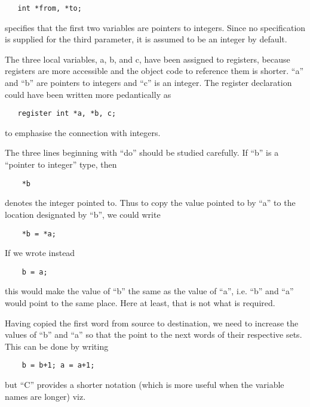 \begin{verbatim}
   int *from, *to;
\end{verbatim}

\noindent specifies that the first two variables
are pointers to integers. Since no
specification is supplied for the third
parameter, it is assumed to be an
integer by default.

The three local variables, a, b, and c,
have been assigned to registers,
because registers are more accessible
and the object code to reference them
is shorter. ``a'' and ``b'' are pointers to
integers and ``c'' is an integer. The
register declaration could have been
written more pedantically as

\begin{verbatim}
   register int *a, *b, c;
\end{verbatim}

\noindent to emphasise the connection with
integers.

The three lines beginning with ``do''
should be studied carefully. If ``b'' is
a ``pointer to integer'' type, then

\begin{verbatim}
    *b
\end{verbatim}

\noindent denotes the integer pointed to. Thus to
copy the value pointed to by ``a'' to the
location designated by ``b'', we could
write

\begin{verbatim}
    *b = *a;
\end{verbatim}

\noindent If we wrote instead

\begin{verbatim}
    b = a;
\end{verbatim}

this would make the value of ``b'' the
same as the value of ``a'', i.e. ``b'' and
``a'' would point to the same place.
Here at least, that is not what is
required.

Having copied the first word from
source to destination, we need to
increase the values of ``b'' and ``a'' so
that the point to the next words of
their respective sets. This can be done
by writing

\begin{verbatim}
    b = b+1; a = a+1;
\end{verbatim}

\noindent but ``C'' provides a shorter notation
(which is more useful when the variable
names are longer) viz.

